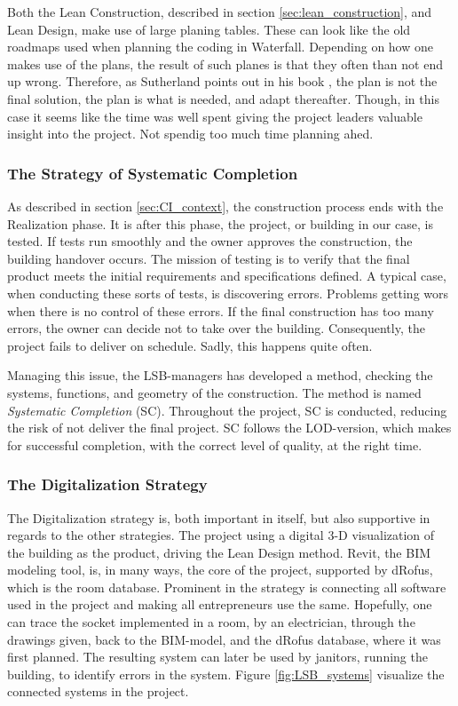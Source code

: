 Both the Lean Construction, described in section \ref{sec:lean_construction}, and Lean Design, make use of large planing tables. These can look like the old roadmaps used when planning the coding in Waterfall. Depending on how one makes use of the plans, the result of such planes is that they often than not end up wrong. Therefore, as Sutherland points out in his book \cite{sutherland}, the plan is not the final solution, the plan is what is needed, and adapt thereafter. Though, in this case it seems like the time was well spent giving the project leaders valuable insight into the project. Not spendig too much time planning ahed. 

\subsubsection*{The Strategy of Systematic Completion}
As described in section \ref{sec:CI_context}, the construction process ends with the Realization phase. It is after this phase, the project, or building in our case, is tested. If tests run smoothly and the owner approves the construction, the building handover occurs. The mission of testing is to verify that the final product meets the initial requirements and specifications defined. A typical case, when conducting these sorts of tests, is discovering errors. Problems getting wors when there is no control of these errors. If the final construction has too many errors, the owner can decide not to take over the building. Consequently, the project fails to deliver on schedule. Sadly, this happens quite often.

Managing this issue, the LSB-managers has developed a method, checking the systems, functions, and geometry of the construction. The method is named \textit{Systematic Completion} (SC). Throughout the project, SC is conducted, reducing the risk of not deliver the final project. SC follows the LOD-version, which makes for successful completion, with the correct level of quality, at the right time.

\subsubsection*{The Digitalization Strategy}
The Digitalization strategy is, both important in itself, but also supportive in regards to the other strategies. The project using a digital 3-D visualization of the building as the product, driving the Lean Design method. Revit, the BIM modeling tool, is, in many ways, the core of the project, supported by dRofus, which is the room database. Prominent in the strategy is connecting all software used in the project and making all entrepreneurs use the same. Hopefully, one can trace the socket implemented in a room, by an electrician, through the drawings given, back to the BIM-model, and the dRofus database, where it was first planned. The resulting system can later be used by janitors, running the building, to identify errors in the system.  Figure \ref{fig:LSB_systems} visualize the connected systems in the project.

